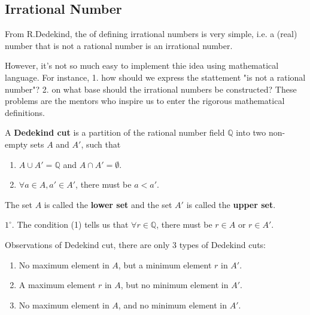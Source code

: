 \documentclass{Math_Note}
\begin{document}
\subsection{Irrational Number}
\begin{intro*}
    From R.Dedekind, the of defining irrational numbers is very simple, i.e. a (real) number that is not a rational number is an irrational number. 

    However, it's not so much easy to implement thie idea using mathematical language. For instance, 1. how should we express the stattement "is not a rational number"? 
    2. on what base should the irrational numbers be constructed? These problems are the mentors who inspire us to enter the rigorous mathematical definitions.
\end{intro*}
\begin{df}
    A \textbf{Dedekind cut} is a partition of the rational number field $\mathbb{Q}$ into two non-empty sets $A$ and $A'$, such that
    \begin{enumerate}[(1)]
        \item $A\cup A'=\mathbb{Q}$ and $A\cap A'=\emptyset$.
        \item $\forall a \in A, a' \in A'$, there must be $a<a'$.
    \end{enumerate}
    The set $A$ is called the \textbf{lower set} and the set $A'$ is called the \textbf{upper set}.
\end{df}
\begin{nt*}
    $1^{\circ}$. The condition (1) tells us that $\forall r \in \mathbb{Q}$, there must be $r\in A$ or $r\in A'$.
\end{nt*}
\begin{prp}
    Observations of Dedekind cut, there are only 3 types of Dedekind cuts:
    \begin{enumerate}[1]
        \item No maximum element in $A$, but a minimum element $r$ in $A'$.
        \item A maximum element $r$ in $A$, but no minimum element in $A'$.
        \item No maximum element in $A$, and no minimum element in $A'$.
    \end{enumerate}
\end{prp}
\end{document}
